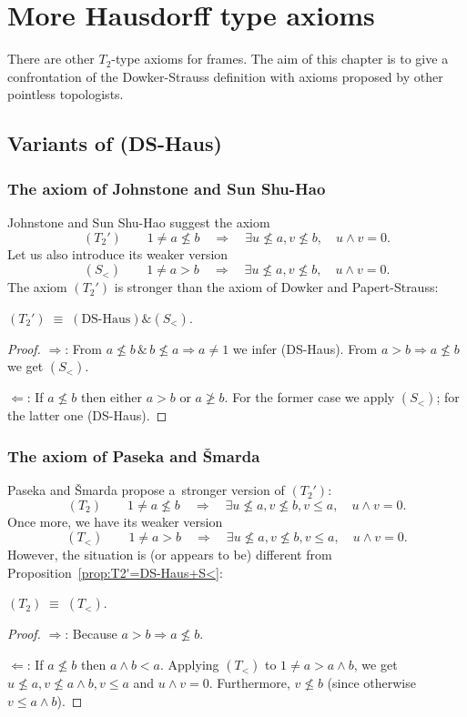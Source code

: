 \chapter{More Hausdorff type axioms}

There are other $T_2$-type axioms for frames.
The aim of this chapter is to give a confrontation of the Dowker-Strauss
definition with axioms proposed by other pointless topologists.

\section{Variants of (DS-Haus)}

\subsection{The axiom of Johnstone and Sun Shu-Hao}

Johnstone and Sun Shu-Hao \cite{johnstone-shu-hao} suggest the axiom
\[
  (T_2') \qquad
  1 \ne a\not\le b \quad \Rightarrow \quad \exists u\not\leq a, v\not\leq b,
  \quad u \wedge v = 0.
\]
Let us also introduce its weaker version
\[
  (S_<) \qquad
  1 \ne a > b \quad \Rightarrow \quad \exists u\not\leq a, v\not\leq b,
  \quad u \wedge v = 0.
\]
The axiom $(T_2')$ is stronger than the axiom of Dowker and Papert-Strauss:
\begin{prop} \label{prop:T2'=DS-Haus+S<}
  $(T_2') \; \equiv \; (\text{DS-Haus}) \& (S_<)$.
\end{prop}
\begin{proof}
  $\Rightarrow$:
  From $a\not\le b \, \& \,  b\not\le a \Rightarrow a \ne 1$ we infer
  (DS-Haus).
  From $a > b \Rightarrow a \not\le b$ we get $(S_<)$.

  $\Leftarrow$:
  If $a \not\le b$ then either $a > b$ or $a\not\ge b$.
  For the former case we apply $(S_<)$; for the latter one (DS-Haus).
\end{proof}

\subsection{The axiom of Paseka and Šmarda}
Paseka and Šmarda \cite{paseka-smarda92} propose a~stronger version of
$(T_2')$:
\[
  (T_2) \qquad
  1 \ne a\not\le b \quad \Rightarrow \quad \exists u\not\leq a, v\not\leq b,
  \boxed{v \le a}, \quad u \wedge v = 0.
\]
Once more, we have its weaker version
\[
  (T_<) \qquad
  1 \ne a > b \quad \Rightarrow \quad \exists u\not\leq a, v\not\leq b, v \le
  a, \quad u \wedge v = 0.
\]
However, the situation is (or appears to be) different from
Proposition~\ref{prop:T2'=DS-Haus+S<}:
\begin{prop}
  $(T_2) \; \equiv \; (T_<)$.
\end{prop}
\begin{proof}
  $\Rightarrow$:
  Because $a > b \Rightarrow a \not\le b$.

  $\Leftarrow$:
  If $a\not\le b$ then $a \wedge b < a$.
  Applying $(T_<)$ to $1 \ne a > a \wedge b$, we get $u\not\le a, v\not\le a
  \wedge b, v\le a$ and $u \wedge v = 0$.
  Furthermore, $v\not\le b$ (since otherwise $v\le a \wedge b$).
\end{proof}

